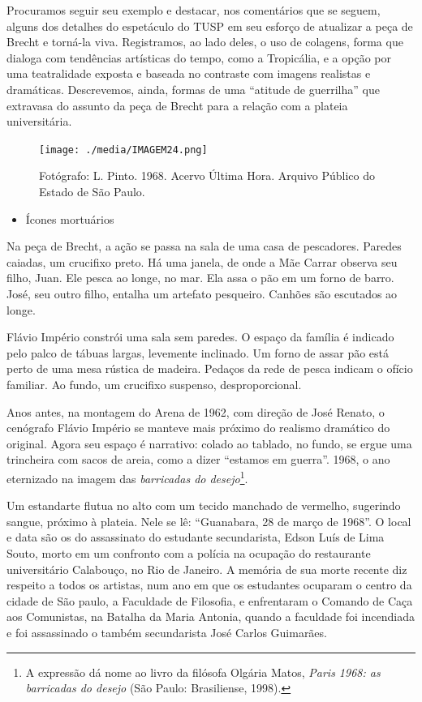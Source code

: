 Procuramos seguir seu exemplo e destacar, nos comentários que se seguem,
alguns dos detalhes do espetáculo do TUSP em seu esforço de atualizar a
peça de Brecht e torná-la viva. Registramos, ao lado deles, o uso de
colagens, forma que dialoga com tendências artísticas do tempo, como a
Tropicália, e a opção por uma teatralidade exposta e baseada no
contraste com imagens realistas e dramáticas. Descrevemos, ainda, formas
de uma “atitude de guerrilha” que extravasa do assunto da peça de Brecht
para a relação com a plateia universitária.

\begin{figure}
\texttt{[image: ./media/IMAGEM24.png]}
\caption{Fotógrafo: L. Pinto. 1968. Acervo Última Hora. Arquivo Público do Estado de São Paulo.}
\end{figure}

\begin{itemize}
\item
  Ícones mortuários
\end{itemize}

Na peça de Brecht, a ação se passa na sala de uma casa de pescadores.
Paredes caiadas, um crucifixo preto. Há uma janela, de onde a Mãe Carrar
observa seu filho, Juan. Ele pesca ao longe, no mar. Ela assa o pão em
um forno de barro. José, seu outro filho, entalha um artefato pesqueiro.
Canhões são escutados ao longe.

Flávio Império constrói uma sala sem paredes. O espaço da família é
indicado pelo palco de tábuas largas, levemente inclinado. Um forno de
assar pão está perto de uma mesa rústica de madeira. Pedaços da rede de
pesca indicam o ofício familiar. Ao fundo, um crucifixo suspenso,
desproporcional.

Anos antes, na montagem do Arena de 1962, com direção de José Renato, o
cenógrafo Flávio Império se manteve mais próximo do realismo dramático
do original. Agora seu espaço é narrativo: colado ao tablado, no fundo,
se ergue uma trincheira com sacos de areia, como a dizer “estamos em
guerra”. 1968, o ano eternizado na imagem das \textit{barricadas do
desejo}\footnote{A expressão dá nome ao livro da filósofa Olgária Matos,
  \textit{Paris 1968: as barricadas do desejo} (São Paulo: Brasiliense,
  1998).}.

Um estandarte flutua no alto com um tecido manchado de vermelho,
sugerindo sangue, próximo à plateia. Nele se lê: “Guanabara, 28 de março
de 1968”. O local e data são os do assassinato do estudante
secundarista, Edson Luís de Lima Souto, morto em um confronto com a
polícia na ocupação do restaurante universitário Calabouço, no Rio de
Janeiro. A memória de sua morte recente diz respeito a todos os
artistas, num ano em que os estudantes ocuparam o centro da cidade de
São paulo, a Faculdade de Filosofia, e enfrentaram o Comando de Caça aos
Comunistas, na Batalha da Maria Antonia, quando a faculdade foi
incendiada e foi assassinado o também secundarista José Carlos
Guimarães.

